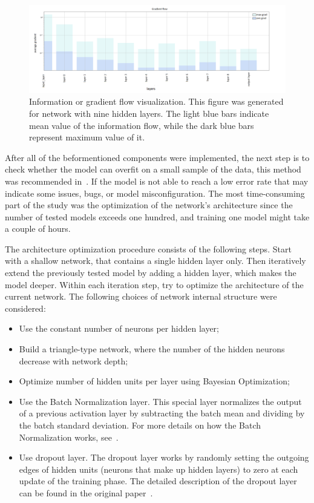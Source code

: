 \begin{figure}[!h]
\centering
\includegraphics[width=\textwidth]{figures/NN/Gradient_flow.png}
\caption{Information or gradient flow visualization. This figure was generated for network with nine hidden layers. The light blue bars indicate mean value of the information flow, while the dark blue bars represent maximum value of it.    
\label{fig:gradient_flow}}
\end{figure}

After all of the beformentioned components were implemented, the next step is to check whether the model can overfit on a small sample of the data, this method was recommended in~\cite{karpathy}. If the model is not able to reach a low error rate that may indicate some issues, bugs, or model misconfiguration.
The most time-consuming part of the study was the optimization of the network's architecture since the number of tested models exceeds one hundred, and training one model might take a couple of hours.

The architecture optimization procedure consists of the following steps. Start with a shallow network, that contains a single hidden layer only. Then iteratively extend the previously tested model by adding a hidden layer, which makes the model deeper. Within each iteration step, try to optimize the architecture of the current network. The following choices of network internal structure were considered: 

\begin{itemize}
\item Use the constant number of neurons per hidden layer; 
\item Build a triangle-type network, where the number of the hidden neurons decrease with network depth; 
\item Optimize number of hidden units per layer using Bayesian Optimization;
\item Use the Batch Normalization layer. This special layer normalizes the output of a previous activation layer by subtracting the batch mean and dividing by the batch standard deviation. For more details on how the Batch Normalization works, see~\cite{batch_norm}. 
\item Use dropout layer. The dropout layer works by randomly setting the outgoing edges of hidden units (neurons that make up hidden layers) to zero at each update of the training phase. The detailed description of the dropout layer can be found in the original paper~\cite{dropout}. 
\end{itemize}


